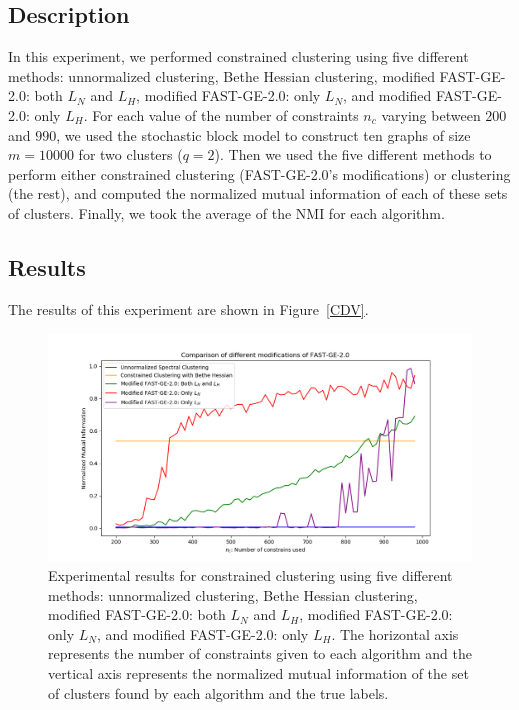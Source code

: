 \subsection*{Description}
In this experiment, we performed constrained clustering using five different methods: unnormalized clustering, Bethe Hessian clustering, modified FAST-GE-2.0: both $L_N$ and $L_H$, modified FAST-GE-2.0: only $L_N$, and modified FAST-GE-2.0: only $L_H$. 
For each value of the number of constraints $n_c$ varying between $200$ and $990$, we used the stochastic block model to construct ten graphs of size $m = 10000$ for two clusters ($q=2$). Then we used the five different methods to perform either constrained clustering (FAST-GE-2.0's modifications) or clustering (the rest), and computed the normalized mutual information of each of these sets of clusters.
Finally, we took the average of the NMI for each algorithm.

\subsection*{Results}
The results of this experiment are shown in Figure~\vref{CDV}.

\begin{figure}[h]
\begin{center}
\includegraphics[width=16cm]{figures/CDV1.png}
\end{center}
   \caption[Experimental results for constrained clustering using five different methods]{Experimental results for constrained clustering using five different methods: unnormalized clustering, Bethe Hessian clustering, modified FAST-GE-2.0: both $L_N$ and $L_H$, modified FAST-GE-2.0: only $L_N$, and modified FAST-GE-2.0: only $L_H$. The horizontal axis represents the number of constraints given to each algorithm and the vertical axis represents the normalized mutual information of the set of clusters found by each algorithm and the true labels.}
\label{CDV}
\end{figure}

